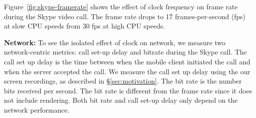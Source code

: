 Figure~\ref{fig:skype-framerate} shows the effect of clock frequency on frame rate during the Skype video call. 
The frame rate drops to 17 frames-per-second (fps) at slow CPU speeds from 30 fps at high CPU speeds. 



\noindent \textbf{Network:} 
To see the isolated effect of clock on network, we measure two network-centric metrics: call set-up delay and bitrate during the Skype call. 
The call set up delay is the time between when the mobile client initiated the call and when the server accepted the call. We measure the call set up delay using the our screen recordings, as described in \S\ref{sec:motivation}. The bit rate is the number bits received per second. The bit rate is different from the frame rate since it does not include rendering. Both bit rate and call set-up delay only depend on the network performance.

